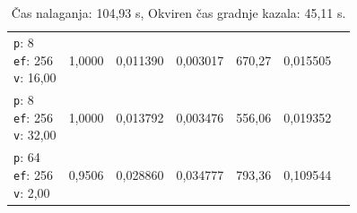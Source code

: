 \begin{table}[htbp]
\begin{tabularx}{\textwidth}{Xrrrrrr}
    \makecell{\texttt{p}: 8\\\texttt{ef}: 256\\\texttt{v}: 16,00} & 1,0000 & 0,011390 & 0,003017 & 670,27 & 0,015505 \\
    \makecell{\texttt{p}: 8\\\texttt{ef}: 256\\\texttt{v}: 32,00} & 1,0000 & 0,013792 & 0,003476 & 556,06 & 0,019352 \\
    \makecell{\texttt{p}: 64\\\texttt{ef}: 256\\\texttt{v}: 2,00} & 0,9506 & 0,028860 & 0,034777 & 793,36 & 0,109544 \\
    \bottomrule
  \end{tabularx}
\caption* {Čas nalaganja: 104,93 s, Okviren čas gradnje kazala: 45,11 s.}\end{table}

